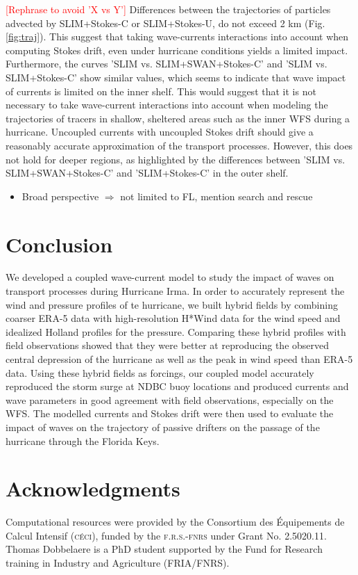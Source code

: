\documentclass[preprint,12pt,authoryear]{elsarticle}
\begin{document}
\textcolor{red}{[Rephrase to avoid 'X vs Y']} Differences between the trajectories of particles advected by SLIM+Stokes-C or SLIM+Stokes-U, do not exceed 2 km (Fig. \ref{fig:traj}). This suggest that taking wave-currents interactions into account when computing Stokes drift, even under hurricane conditions yields a limited impact. Furthermore, the curves 'SLIM vs. SLIM+SWAN+Stokes-C' and 'SLIM vs. SLIM+Stokes-C' show similar values, which seems to indicate that wave impact of currents is limited on the inner shelf. This would suggest that it is not necessary to take wave-current interactions into account when modeling the trajectories of tracers in shallow, sheltered areas such as the inner WFS during a hurricane. Uncoupled currents with uncoupled Stokes drift should give a reasonably accurate approximation of the transport processes. However, this does not hold for deeper regions, as highlighted by the differences between 'SLIM vs. SLIM+SWAN+Stokes-C' and 'SLIM+Stokes-C' in the outer shelf. 

\begin{itemize}
    \item Broad perspective $\Rightarrow$ not limited to FL, mention search and rescue
\end{itemize}

\section{Conclusion}

We developed a coupled wave-current model to study the impact of waves on transport processes during Hurricane Irma. In order to accurately represent the wind and pressure profiles of te hurricane, we built hybrid fields by combining coarser ERA-5 data with high-resolution H*Wind data for the wind speed and idealized Holland profiles for the pressure. Comparing these hybrid profiles with field observations showed that they were better at reproducing the observed central depression of the hurricane as well as the peak in wind speed than ERA-5 data. Using these hybrid fields as forcings, our coupled model accurately reproduced the storm surge at NDBC buoy locations and produced currents and wave parameters in good agreement with field observations, especially on the WFS. The modelled currents and Stokes drift were then used to evaluate the impact of waves on the trajectory of passive drifters on the passage of the hurricane through the Florida Keys.

\section*{Acknowledgments}
Computational resources were provided by the Consortium des \'Equipements de Calcul Intensif (\textsc{c\'eci}), funded by the \textsc{f.r.s.-fnrs} under Grant No. 2.5020.11. Thomas Dobbelaere is a PhD student supported by the Fund for Research training in Industry and Agriculture (\textsc{FRIA}/\textsc{FNRS}).

 

\end{document}
